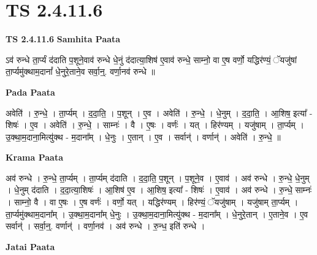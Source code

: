 \documentclass[17pt]{extarticle}
\begin{document}
\section{ TS 2.4.11.6 }

\textbf{TS 2.4.11.6 } \newline
\textbf{Samhita Paata} \newline

ऽव॑ रुन्धे ता॒र्प्यं द॑दाति प॒शूने॒वाव॑ रुन्धे धे॒नुं द॑दात्या॒शिष॑ ए॒वाव॑ रुन्धे॒ साम्नो॒ वा ए॒ष वर्णो॒ यद्धिर॑ण्यं॒ ॅयजु॑षां ता॒र्प्यमु॑क्थाम॒दानां᳚ धे॒नुरे॒ताने॒व सर्वा॒न्॒. वर्णा॒नव॑ रुन्धे ॥ \newline

\textbf{Pada Paata} \newline

अवेति॑ । रु॒न्धे॒ । ता॒र्प्यम् । द॒दा॒ति॒ । प॒शून् । ए॒व । अवेति॑ । रु॒न्धे॒ । धे॒नुम् । द॒दा॒ति॒ । आ॒शिष॒ इत्या᳚ - शिषः॑ । ए॒व । अवेति॑ । रु॒न्धे॒ । साम्नः॑ । वै । ए॒षः । वर्णः॑ । यत् । हिर॑ण्यम् । यजु॑षाम् । ता॒र्प्यम् । उ॒क्था॒म॒दाना॒मित्यु॑क्थ - म॒दाना᳚म् । धे॒नुः । ए॒तान् । ए॒व । सर्वान्॑ । वर्णान्॑ । अवेति॑ । रु॒न्धे॒ ॥  \newline


\textbf{Krama Paata} \newline

अव॑ रुन्धे । रु॒न्धे॒ ता॒र्प्यम् । ता॒र्प्यम् द॑दाति । द॒दा॒ति॒ प॒शून् । प॒शूने॒व । ए॒वाव॑ । अव॑ रुन्धे । रु॒न्धे॒ धे॒नुम् । धे॒नुम् द॑दाति । द॒दा॒त्या॒शिषः॑ । आ॒शिष॑ ए॒व । आ॒शिष॒ इत्या᳚ - शिषः॑ । ए॒वाव॑ । अव॑ रुन्धे । रु॒न्धे॒ साम्नः॑ । साम्नो॒ वै । वा ए॒षः । ए॒ष वर्णः॑ । वर्णो॒ यत् । यद्धिर॑ण्यम् । हिर॑ण्यं॒ ॅयजु॑षाम् । यजु॑षाम् ता॒र्प्यम् । ता॒र्प्यमु॑क्थाम॒दाना᳚म् । उ॒क्था॒म॒दाना᳚म् धे॒नुः । उ॒क्था॒म॒दाना॒मित्यु॑क्थ - म॒दाना᳚म् । धे॒नुरे॒तान् । ए॒ताने॒व । ए॒व सर्वान्॑ । सर्वा॒न्॒. वर्णान्॑ । वर्णा॒नव॑ । अव॑ रुन्धे । रु॒न्ध॒ इति॑ रुन्धे । \newline

\textbf{Jatai Paata} \newline
\end{document}
